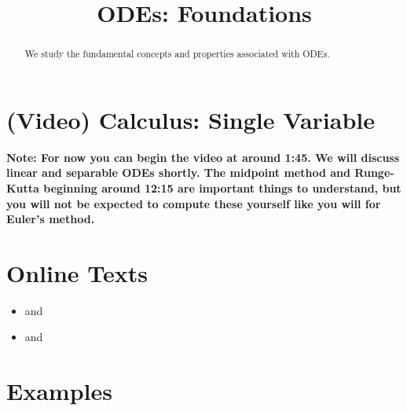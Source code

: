 \documentclass{ximera}
\title{ODEs: Foundations}
\begin{document}
\begin{abstract}
We study the fundamental concepts and properties associated with ODEs.
\end{abstract}
\maketitle

\section*{(Video) Calculus: Single Variable}
\textbf{Note: For now you can begin the video at around 1:45. We will discuss linear and separable ODEs shortly. The midpoint method and Runge-Kutta beginning around 12:15 are important things to understand, but you will not be expected to compute these yourself like you will for Euler's method.}

\section*{Online Texts}
\begin{itemize}
\item {} and 
\item {} and 
\end{itemize}

\section*{Examples}
\end{document}
